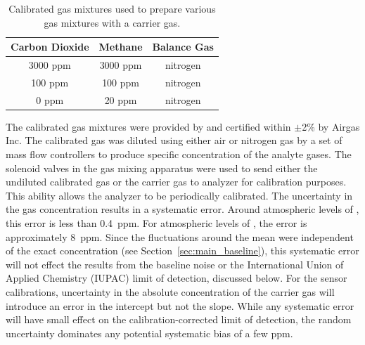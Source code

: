 \documentclass[sensors,article,submit,moreauthors,pdftex]{Definitions/mdpi}
\begin{document}
			\begin{table}[!t]
				\caption{Calibrated gas mixtures used to prepare various gas mixtures with a carrier gas.}
				\label{tab:ratios}
				\small
				\centering
				\begin{tabular}{c | c | c}
					Carbon Dioxide & Methane  & Balance Gas \\ \hline
					3000 ppm       & 3000 ppm & nitrogen    \\
					100 ppm        & 100 ppm  & nitrogen    \\
					0 ppm          & 20 ppm   & nitrogen
				\end{tabular} 
			\end{table}
			
			The calibrated gas mixtures were provided by and certified within $\pm$2\% by Airgas Inc.
			The calibrated gas was diluted using either air or nitrogen gas by a set of mass flow controllers to produce specific concentration of the analyte gases.
			The solenoid valves in the gas mixing apparatus were used to send either the undiluted calibrated gas or the carrier gas to analyzer for calibration purposes.
			This ability allows the analyzer to be periodically calibrated.
			The uncertainty in the gas concentration results in a systematic error.
			Around atmospheric levels of , this error is less than 0.4~ppm.
			For atmospheric levels of , the error is approximately 8~ppm.
			Since the fluctuations around the mean were independent of the exact concentration (see Section~\ref{sec:main_baseline}), this systematic error will not effect the results from the baseline noise or the International Union of Applied Chemistry (IUPAC) limit of detection, discussed below.
			For the sensor calibrations, uncertainty in the absolute concentration of the carrier gas will introduce an error in the intercept but not the slope.
			While any systematic error will have small effect on the calibration-corrected limit of detection, the random uncertainty dominates any potential systematic bias of a few ppm.  
			
\end{document}
